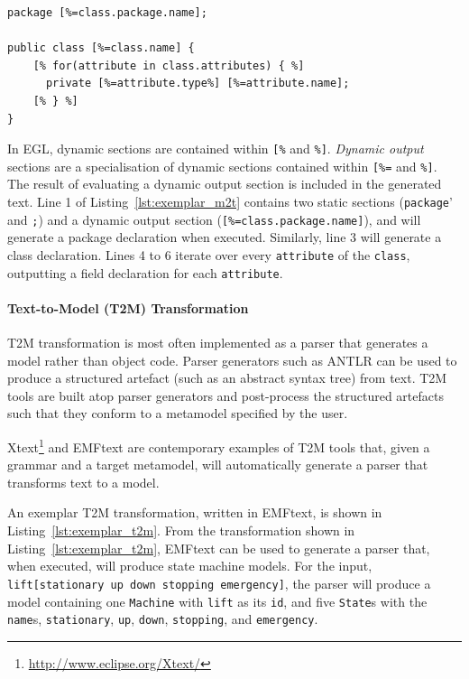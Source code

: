 \begin{lstlisting}[caption={[Exemplar M2T transformation in EGL]Exemplar M2T transformation in the Epsilon Generation Language \cite{rose08egl}}, label=lst:exemplar_m2t, language=EGL]
package [%=class.package.name];

public class [%=class.name] {
	[% for(attribute in class.attributes) { %]
	  private [%=attribute.type%] [%=attribute.name];
	[% } %]
}
\end{lstlisting}

In EGL, dynamic sections are contained within \texttt{[\%} and \texttt{\%]}. \emph{Dynamic output} sections are a specialisation of dynamic sections contained within \texttt{[\%=} and \texttt{\%]}. The result of evaluating a dynamic output section is included in the generated text. Line 1 of Listing~\ref{lst:exemplar_m2t} contains two static sections (\texttt{package}' and \texttt{;}) and a dynamic output section (\texttt{[\%=class.package.name]}), and will generate a package declaration when executed.  Similarly, line 3 will generate a class declaration. Lines 4 to 6 iterate over every \texttt{attribute} of the \texttt{class}, outputting a field declaration for each \texttt{attribute}.


\paragraph{Text-to-Model (T2M) Transformation} T2M transformation is most often implemented as a parser that generates a model rather than object code. Parser generators such as ANTLR \cite{parr07antlr} can be used to produce a structured artefact (such as an abstract syntax tree) from text. T2M tools are built atop parser generators and post-process the structured artefacts such that they conform to a metamodel specified by the user.

Xtext\footnote{\url{http://www.eclipse.org/Xtext/}} and EMFtext \cite{heidenreich09derivation} are contemporary examples of T2M tools that, given a grammar and a target metamodel, will automatically generate a parser that transforms text to a model.

An exemplar T2M transformation, written in EMFtext, is shown in Listing~\ref{lst:exemplar_t2m}. From the transformation shown in Listing~\ref{lst:exemplar_t2m}, EMFtext can be used to generate a parser that, when executed, will produce state machine models. For the input, \texttt{lift[stationary up down stopping emergency]}, the parser will produce a model containing one \texttt{Machine} with \texttt{lift} as its \texttt{id}, and five \texttt{State}s with the \texttt{name}s, \texttt{stationary}, \texttt{up}, \texttt{down}, \texttt{stopping}, and \texttt{emergency}.

